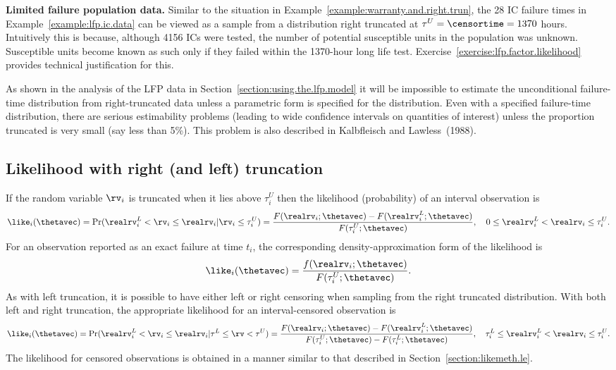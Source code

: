 \begin{example}
\label{example:lfp.trunc}
{\bf Limited failure population data.} Similar to the situation in
Example~\ref{example:warranty.and.right.trun}, the 28 IC failure times
in Example~\ref{example:lfp.ic.data} can be viewed as a sample from a
distribution right truncated at $\tau^{U}=\censortime=1370$ hours.
Intuitively this is because, although 4156 ICs were tested, the number
of potential susceptible units in the population was unknown.
Susceptible units become known as such only if they failed within the
1370-hour long life test.
Exercise~\ref{exercise:lfp.factor.likelihood} provides technical
justification for this.
\end{example}

As shown in the analysis of the LFP data in
Section~\ref{section:using.the.lfp.model} it will be impossible to
estimate the unconditional failure-time distribution from
right-truncated data unless a parametric form is specified for the
distribution. Even with a specified failure-time distribution, there
are serious estimability problems (leading to wide confidence
intervals on quantities of interest) unless the proportion truncated
is very small (say less than 5\%). This problem is also described in
Kalbfleisch and Lawless~(1988).

\subsection{Likelihood with right (and left) truncation}

If the random variable $\rv_{i}$ is truncated when it lies above
$\tau^{U}_{i}$ then the likelihood (probability) of an interval
observation is
\begin{displaymath}
\like_{i}(\thetavec)=\Pr(\realrv^{L}_{i} < \rv_{i} 
\leq \realrv_{i}|\rv_{i} \leq
\tau^{U}_{i}) =
\frac{F(\realrv_{i};\thetavec)-F(\realrv^{L}_{i};\thetavec)}
{F(\tau^{U}_{i};\thetavec)}, \quad 0 \leq \realrv_{i}^{L} < 
\realrv_{i} \leq \tau_{i}^{U}.
\end{displaymath}
For an observation reported as an exact failure at time $t_{i}$, the
corresponding density-approximation form of the likelihood is
\begin{displaymath}
\like_{i}(\thetavec)=
\frac{f(\realrv_{i};\thetavec)}
{F(\tau^{U}_{i};\thetavec)}.
\end{displaymath}
As with left truncation, it is possible to have either left or right
censoring when sampling from the right truncated distribution.
With both left and right truncation, the appropriate likelihood for an
interval-censored observation is
\begin{displaymath}
\like_{i}(\thetavec) = \Pr(\realrv^{L}_{i} <  \rv_{i} 
\leq \realrv_{i}|\tau^{L} \leq \rv < \tau^{U}) =
\frac{F(\realrv_{i};\thetavec)-F(\realrv^{L}_{i};\thetavec)}
{F(\tau^{U}_{i};\thetavec) - F(\tau^{L}_{i};\thetavec)}, \quad \tau_{i}^{L} 
\leq \realrv_{i}^{L} < \realrv_{i} \leq \tau_{i}^{U}.
\end{displaymath}
The likelihood for censored observations is obtained in a manner similar
to that described in Section~\ref{section:likemeth.le}.

